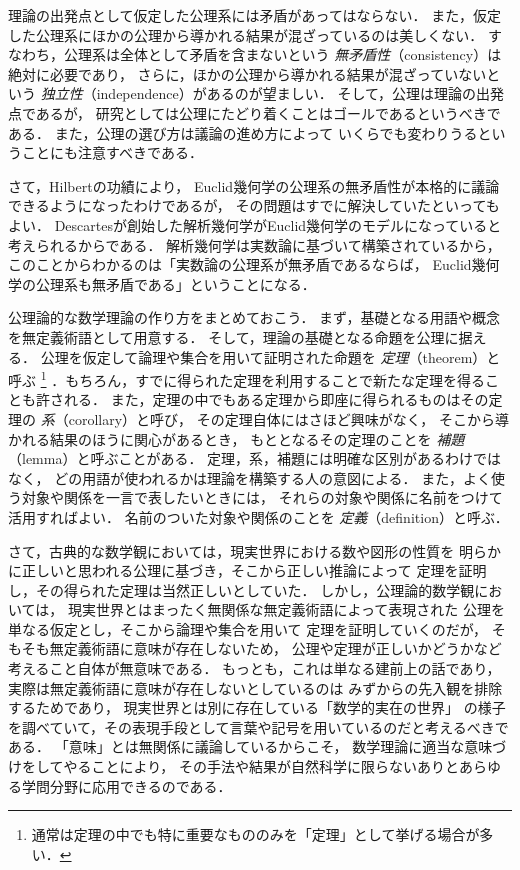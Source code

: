   理論の出発点として仮定した公理系には矛盾があってはならない．
  また，仮定した公理系にほかの公理から導かれる結果が混ざっているのは美しくない．
  すなわち，公理系は全体として矛盾を含まないという
  \emph{無矛盾性}（consistency）は絶対に必要であり，
  さらに，ほかの公理から導かれる結果が混ざっていないという
  \emph{独立性}（independence）があるのが望ましい．
  そして，公理は理論の出発点であるが，
  研究としては公理にたどり着くことはゴールであるというべきである．
  また，公理の選び方は議論の進め方によって
  いくらでも変わりうるということにも注意すべきである．

  さて，Hilbertの功績により，
  Euclid幾何学の公理系の無矛盾性が本格的に議論できるようになったわけであるが，
  その問題はすでに解決していたといってもよい．
  Descartesが創始した解析幾何学がEuclid幾何学のモデルになっていると考えられるからである．
  解析幾何学は実数論に基づいて構築されているから，
  このことからわかるのは「実数論の公理系が無矛盾であるならば，
  Euclid幾何学の公理系も無矛盾である」ということになる．
  
  公理論的な数学理論の作り方をまとめておこう．
  まず，基礎となる用語や概念を無定義術語として用意する．
  そして，理論の基礎となる命題を公理に据える．
  公理を仮定して論理や集合を用いて証明された命題を
  \emph{定理}（theorem）と呼ぶ
  \footnote{通常は定理の中でも特に重要なもののみを「定理」として挙げる場合が多い．}
  ．もちろん，すでに得られた定理を利用することで新たな定理を得ることも許される．
  また，定理の中でもある定理から即座に得られるものはその定理の
  \emph{系}（corollary）と呼び，
  その定理自体にはさほど興味がなく，
  そこから導かれる結果のほうに関心があるとき，
  もととなるその定理のことを
  \emph{補題}（lemma）と呼ぶことがある．
  定理，系，補題には明確な区別があるわけではなく，
  どの用語が使われるかは理論を構築する人の意図による．
  また，よく使う対象や関係を一言で表したいときには，
  それらの対象や関係に名前をつけて活用すればよい．
  名前のついた対象や関係のことを
  \emph{定義}（definition）と呼ぶ．

  さて，古典的な数学観においては，現実世界における数や図形の性質を
  明らかに正しいと思われる公理に基づき，そこから正しい推論によって
  定理を証明し，その得られた定理は当然正しいとしていた．
  しかし，公理論的数学観においては，
  現実世界とはまったく無関係な無定義術語によって表現された
  公理を単なる仮定とし，そこから論理や集合を用いて
  定理を証明していくのだが，
  そもそも無定義術語に意味が存在しないため，
  公理や定理が正しいかどうかなど考えること自体が無意味である．
  もっとも，これは単なる建前上の話であり，
  実際は無定義術語に意味が存在しないとしているのは
  みずからの先入観を排除するためであり，
  現実世界とは別に存在している「数学的実在の世界」
  の様子を調べていて，その表現手段として言葉や記号を用いているのだと考えるべきである．
  「意味」とは無関係に議論しているからこそ，
  数学理論に適当な意味づけをしてやることにより，
  その手法や結果が自然科学に限らないありとあらゆる学問分野に応用できるのである．






